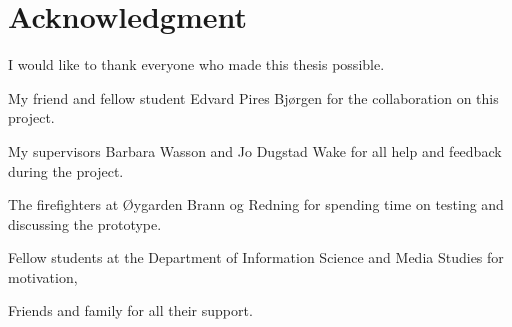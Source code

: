 \documentclass[../Main/thesis.tex]{subfiles}
\begin{document}
\chapter*{Acknowledgment}
I would like to thank everyone who made this thesis possible.

My friend and fellow student Edvard Pires Bjørgen for the collaboration on this project.

My supervisors Barbara Wasson and Jo Dugstad Wake for all help and feedback during the project.

The firefighters at Øygarden Brann og Redning for spending time on testing and discussing the prototype.

Fellow students at the Department of Information Science and Media Studies for motivation,  

Friends and family for all their support.


\blankpage
\end{document}
